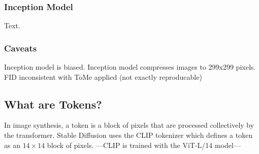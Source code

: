 \subsubsection{Inception Model}
Text.




\subsubsection{Caveats}
Inception model is biased. Inception model compresses images to 299x299 pixels. FID inconsistent with ToMe applied (not exactly reproducable)



\subsection{What are Tokens?}
In image synthesis, a token is a block of pixels that are processed collectively by the transformer. Stable Diffusion uses the CLIP tokenizer \cite{radford2021learning} which defines a token as an $14 \times 14$ block of pixels. ---CLIP is trained with the ViT-L/14 model---